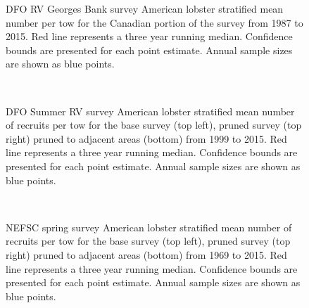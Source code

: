 \documentclass[11pt]{article}
\newcommand{\e}{/backup/bio_data/bio.lobster/figures/} %
\begin{document}
\begin{figure}

    \caption{DFO RV Georges Bank survey American lobster stratified mean number per tow for the Canadian portion of the survey from 1987 to 2015. Red line represents a three year running median. Confidence bounds are presented for each point estimate. Annual sample sizes are shown as blue points. }

\end{figure}



\begin{figure}
\centering
{}\\

\caption{DFO Summer RV survey American lobster stratified mean number of recruits per tow for the base survey (top left), pruned survey (top right) pruned to adjacent areas (bottom) from 1999 to 2015. Red line represents a three year running median. Confidence bounds are presented for each point estimate. Annual sample sizes are shown as blue points. }
\end{figure}
\clearpage



\begin{figure}
\centering
{}\\

\caption{NEFSC spring survey American lobster stratified mean number of recruits per tow for the base survey (top left), pruned survey (top right) pruned to adjacent areas (bottom) from 1969 to 2015. Red line represents a three year running median. Confidence bounds are presented for each point estimate. Annual sample sizes are shown as blue points. }
\end{figure}
\clearpage
\end{document}
